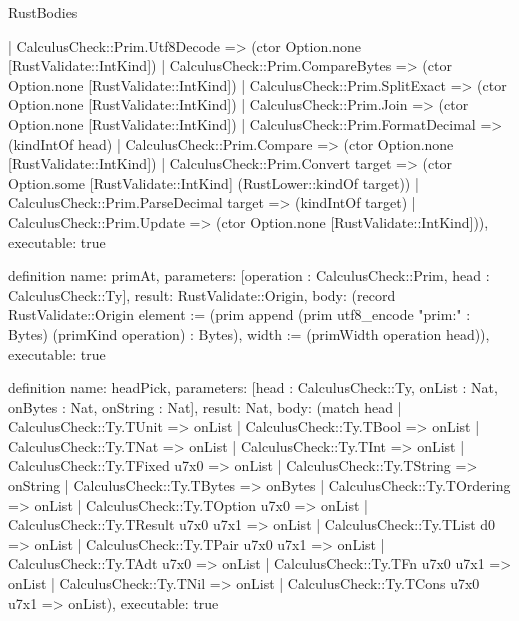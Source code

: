 \begin{lexlean}{RustBodies}
\begin{semanticmodule}
{    | CalculusCheck::Prim.Utf8Decode => (ctor Option.none [RustValidate::IntKind])
    | CalculusCheck::Prim.CompareBytes => (ctor Option.none [RustValidate::IntKind])
    | CalculusCheck::Prim.SplitExact => (ctor Option.none [RustValidate::IntKind])
    | CalculusCheck::Prim.Join => (ctor Option.none [RustValidate::IntKind])
    | CalculusCheck::Prim.FormatDecimal => (kindIntOf head)
    | CalculusCheck::Prim.Compare => (ctor Option.none [RustValidate::IntKind])
    | CalculusCheck::Prim.Convert target => (ctor Option.some [RustValidate::IntKind] (RustLower::kindOf target))
    | CalculusCheck::Prim.ParseDecimal target => (kindIntOf target)
    | CalculusCheck::Prim.Update => (ctor Option.none [RustValidate::IntKind])),
  executable: true
}

definition{
  name: primAt,
  parameters: [operation : CalculusCheck::Prim, head : CalculusCheck::Ty],
  result: RustValidate::Origin,
  body: (record RustValidate::Origin {element := (prim append (prim utf8_encode "prim:" : Bytes) (primKind operation) : Bytes), width := (primWidth operation head)}),
  executable: true
}

definition{
  name: headPick,
  parameters: [head : CalculusCheck::Ty, onList : Nat, onBytes : Nat, onString : Nat],
  result: Nat,
  body: (match head
    | CalculusCheck::Ty.TUnit => onList
    | CalculusCheck::Ty.TBool => onList
    | CalculusCheck::Ty.TNat => onList
    | CalculusCheck::Ty.TInt => onList
    | CalculusCheck::Ty.TFixed u7x0 => onList
    | CalculusCheck::Ty.TString => onString
    | CalculusCheck::Ty.TBytes => onBytes
    | CalculusCheck::Ty.TOrdering => onList
    | CalculusCheck::Ty.TOption u7x0 => onList
    | CalculusCheck::Ty.TResult u7x0 u7x1 => onList
    | CalculusCheck::Ty.TList d0 => onList
    | CalculusCheck::Ty.TPair u7x0 u7x1 => onList
    | CalculusCheck::Ty.TAdt u7x0 => onList
    | CalculusCheck::Ty.TFn u7x0 u7x1 => onList
    | CalculusCheck::Ty.TNil => onList
    | CalculusCheck::Ty.TCons u7x0 u7x1 => onList),
  executable: true
}


\end{semanticmodule}
\end{lexlean}
